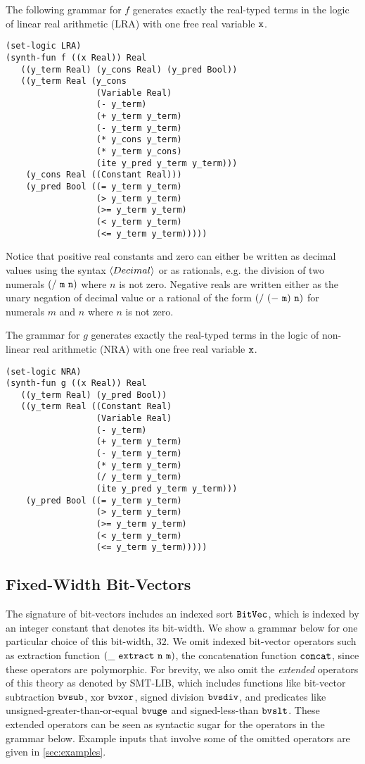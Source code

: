 \documentclass[english,a4paper,10pt]{article}
\begin{document}
\begin{appendix}
The following grammar for $f$
generates exactly the real-typed terms in the logic of
linear real arithmetic (LRA)
with one free real variable ${\tt x}$.
\begin{lstlisting}[language=SyGuS]
(set-logic LRA)
(synth-fun f ((x Real)) Real
   ((y_term Real) (y_cons Real) (y_pred Bool))
   ((y_term Real (y_cons 
                  (Variable Real) 
                  (- y_term)
                  (+ y_term y_term)
                  (- y_term y_term)
                  (* y_cons y_term)
                  (* y_term y_cons)
                  (ite y_pred y_term y_term)))
    (y_cons Real ((Constant Real)))
    (y_pred Bool ((= y_term y_term)
                  (> y_term y_term)
                  (>= y_term y_term)
                  (< y_term y_term)
                  (<= y_term y_term)))))
\end{lstlisting}
Notice that positive real constants and zero can either be written 
as decimal values using the syntax $\left\langle Decimal\right\rangle$
or as rationals, e.g. the division of two numerals
${\tt (/\ m\ n)}$ where $n$ is not zero.
Negative reals are written either as the unary negation of decimal value 
or a rational of the form ${\tt (/\ (-\ m)\ n)}$ for numerals $m$ and $n$
where $n$ is not zero.

The grammar for $g$
generates exactly the real-typed terms in the logic of
non-linear real arithmetic (NRA)
with one free real variable ${\tt x}$.
\begin{lstlisting}[language=SyGuS]
(set-logic NRA)
(synth-fun g ((x Real)) Real
   ((y_term Real) (y_pred Bool))
   ((y_term Real ((Constant Real) 
                  (Variable Real)
                  (- y_term)
                  (+ y_term y_term)
                  (- y_term y_term)
                  (* y_term y_term)
                  (/ y_term y_term)
                  (ite y_pred y_term y_term)))
    (y_pred Bool ((= y_term y_term)
                  (> y_term y_term)
                  (>= y_term y_term)
                  (< y_term y_term)
                  (<= y_term y_term)))))
\end{lstlisting}

\subsection{Fixed-Width Bit-Vectors}

The signature of bit-vectors includes an indexed sort
${\tt BitVec}$, which is indexed by an integer constant that denotes
its bit-width. We show a grammar below for one particular
choice of this bit-width, $32$.
We omit indexed bit-vector operators
such as extraction function ${\tt (\_\ extract\ n\ m)}$, 
the concatenation function ${\tt concat}$,
since these operators are polymorphic.
For brevity,
we also omit the \emph{extended} operators of this theory
as denoted by SMT-LIB,
which includes functions like
bit-vector subtraction ${\tt bvsub}$,
xor ${\tt bvxor}$,
signed division ${\tt bvsdiv}$,
and predicates like
unsigned-greater-than-or-equal ${\tt bvuge}$
and signed-less-than ${\tt bvslt}$.
These extended operators can be seen as syntactic sugar for the
operators in the grammar below.
Example inputs that involve 
some of the omitted operators are given in \cref{sec:examples}.


\end{appendix}
\end{document}

